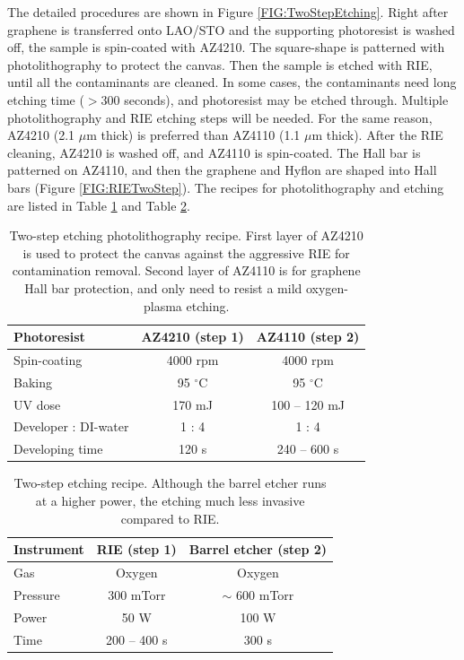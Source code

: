 \documentclass[pdflatex, sectionletters, 12pt, final, phd]{pittetd}    %
\begin{document}
The detailed procedures are shown in Figure \ref{FIG:TwoStepEtching}. Right after graphene is transferred onto LAO/STO and the supporting photoresist is washed off, the sample is spin-coated with AZ4210. The square-shape is patterned with photolithography to protect the canvas. Then the sample is etched with RIE, until all the contaminants are cleaned. In some cases, the contaminants need long etching time ($> 300$ seconds), and photoresist may be etched through. Multiple photolithography and RIE etching steps will be needed.
For the same reason, AZ4210 (2.1 $\mu$m thick) is preferred than AZ4110 (1.1 $\mu$m thick). After the RIE cleaning, AZ4210 is washed off, and AZ4110 is spin-coated. The Hall bar is patterned on AZ4110, and then the graphene and Hyflon are shaped into Hall bars (Figure \ref{FIG:RIETwoStep}). The recipes for photolithography and etching are listed in Table \ref{TAB:TwoStepPL} and Table \ref{TAB:TwoStepEtching}.

\begin{table}
	\centering
	\begin{tabular}{l|cc}
		\hline
		Photoresist    & AZ4210 (step 1) & AZ4110 (step 2) \\ \hline
		Spin-coating    &    4000 rpm    &    4000 rpm \\ 
		Baking    &    95 $^{\circ}$C    &    95 $^{\circ}$C    \\ 
		UV dose    &    170 mJ    &    100 -- 120 mJ    \\
		Developer : DI-water    &    1 : 4 &    1 : 4 \\ 
		Developing time    &    120 s    &    240 -- 600 s \\
		\hline
	\end{tabular}
	\caption[Two-step etching photolithography recipe]{Two-step etching photolithography recipe. First layer of AZ4210 is used to protect the canvas against the aggressive RIE for contamination removal. Second layer of AZ4110 is for graphene Hall bar protection, and only need to resist a mild oxygen-plasma etching.}
	\label{TAB:TwoStepPL}
\end{table}

\begin{table}
	\centering
	\begin{tabular}{l|cc}
		\hline
		Instrument    & RIE (step 1)    &    Barrel etcher (step 2) \\ \hline
		Gas    &    Oxygen &    Oxygen \\ 
		Pressure    &    300 mTorr    &    $\sim$ 600 mTorr \\
		Power    &    50 W    &    100 W \\
		Time    &    200 -- 400 s &    300 s\\ \hline
	\end{tabular}
	\caption[Two-step etching recipe]{Two-step etching recipe. Although the barrel etcher runs at a higher power, the etching much less invasive compared to RIE.}
	\label{TAB:TwoStepEtching}
\end{table}
\end{document}
